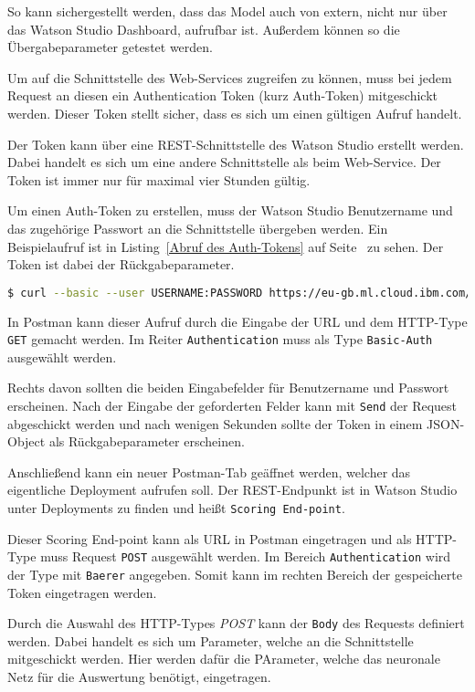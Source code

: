 So kann sichergestellt werden, dass das Model auch von extern, nicht nur über das Watson Studio Dashboard, aufrufbar ist.
Außerdem können so die Übergabeparameter getestet werden.

Um auf die Schnittstelle des Web-Services zugreifen zu können, muss bei jedem Request an diesen ein Authentication Token
(kurz Auth-Token) mitgeschickt werden. Dieser Token stellt sicher, dass es sich um einen gültigen Aufruf handelt.

Der Token kann über eine REST-Schnittstelle des Watson Studio erstellt werden. Dabei handelt es sich um eine andere
Schnittstelle als beim Web-Service. Der Token ist immer nur für maximal vier Stunden gültig.

Um einen Auth-Token zu erstellen, muss der Watson Studio Benutzername und das zugehörige Passwort an die Schnittstelle
übergeben werden. Ein Beispielaufruf ist in Listing~\ref{Abruf des Auth-Tokens} auf Seite~\pageref{Abruf des Auth-Tokens}
zu sehen. Der Token ist dabei der Rückgabeparameter.

\begin{lstlisting}[language=bash, caption=Abruf des Auth-Tokens, label=Abruf des Auth-Tokens]
$ curl --basic --user USERNAME:PASSWORD https://eu-gb.ml.cloud.ibm.com/v3/identity/token
\end{lstlisting}

In Postman kann dieser Aufruf durch die Eingabe der URL und dem HTTP-Type \texttt{GET} gemacht werden. Im Reiter
\texttt{Authentication} muss als Type \texttt{Basic-Auth} ausgewählt werden.

Rechts davon sollten die beiden Eingabefelder für Benutzername und Passwort erscheinen. Nach der Eingabe der geforderten
Felder kann mit \texttt{Send} der Request abgeschickt werden und nach wenigen Sekunden sollte der Token in einem
JSON-Object als Rückgabeparameter erscheinen.

Anschließend kann ein neuer Postman-Tab geäffnet werden, welcher das eigentliche Deployment aufrufen soll. Der
REST-Endpunkt ist in Watson Studio unter Deployments zu finden und heißt \texttt{Scoring End-point}.

Dieser Scoring End-point kann als URL in Postman eingetragen und als HTTP-Type muss Request \texttt{POST} ausgewählt
werden. Im Bereich \texttt{Authentication} wird der Type mit \texttt{Baerer} angegeben. Somit kann im rechten Bereich der
gespeicherte Token eingetragen werden.

Durch die Auswahl des HTTP-Types \textit{POST} kann der \texttt{Body} des Requests definiert werden. Dabei handelt es
sich um Parameter, welche an die Schnittstelle mitgeschickt werden. Hier werden dafür die PArameter, welche das
neuronale Netz für die Auswertung benötigt, eingetragen.

